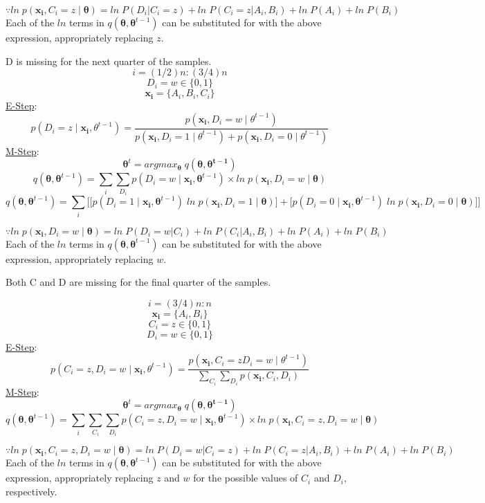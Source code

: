 \documentclass[english]{article}
\begin{document}
\begin{enumerate}
    $$ \because ln \; p(\mathbf{x_i},C_i = z \;|\; \bm{\theta}) = ln \; P(D_i | C_i = z) + ln \; P(C_i = z| A_i, B_i)  + ln \; P(A_i) + ln \; P(B_i)$$
    Each of the $ln$ terms in $q(\bm{\theta},\bm{\theta}^{t-1})$ can be substituted for with the above expression, appropriately replacing $z$.
    
    D is missing for the next quarter of the samples. 
    $$i = (1/2)n:(3/4)n$$
    $$D_i = w \in \{0,1\}$$
    $$\mathbf{x_i} = \{A_i, B_i, C_i\}$$ 
    \underline{E-Step}:
    $$p(D_i = z\;|\; \mathbf{x_i}, \theta^{t-1}) = \frac{p(\mathbf{x_i}, D_i = w \;|\; \theta^{t-1})}{p(\mathbf{x_i}, D_i = 1 \;|\; \theta^{t-1}) + p(\mathbf{x_i}, D_i = 0 \;|\; \theta^{t-1})}$$
    \underline{M-Step}:
    $$\bm{\theta}^t = arg max_{\bm{\theta}} \; q(\bm{\theta},\bm{\theta^{t-1}})$$
    $$ q(\bm{\theta},\bm{\theta}^{t-1}) = \sum_{i}\sum_{D_i}p(D_i = w\;|\; \mathbf{x_i}, \bm{\theta}^{t-1}) \times ln \; p(\mathbf{x_i},D_i = w\;|\; \bm{\theta})$$
    $$q(\bm{\theta},\bm{\theta}^{t-1}) = \sum_{i} \bigg[ \big[p(D_i = 1 \;|\; \mathbf{x_i}, \bm{\theta}^{t-1}) \; ln \; p(\mathbf{x_i},D_i = 1 \;|\; \bm{\theta})\big] + \big[ p(D_i = 0 \;|\; \mathbf{x_i}, \bm{\theta}^{t-1}) \; ln \; p(\mathbf{x_i},D_i = 0 \;|\; \bm{\theta}) \big] \bigg]$$
    
    $$ \because ln \; p(\mathbf{x_i},D_i = w \;|\; \bm{\theta}) = ln \; P(D_i = w | C_i) + ln \; P(C_i | A_i, B_i)  + ln \; P(A_i) + ln \; P(B_i)$$
    Each of the $ln$ terms in $q(\bm{\theta},\bm{\theta}^{t-1})$ can be substituted for with the above expression, appropriately replacing $w$.
    
    Both C and D are missing for the final quarter of the samples.
    
    $$i = (3/4)n:n$$
    $$\mathbf{x_i} = \{A_i, B_i\}$$ 
    $$C_i = z \in \{0,1\}$$
    $$D_i = w \in \{0,1\}$$
    \underline{E-Step}:
    $$p(C_i = z, D_i = w\;|\; \mathbf{x_i}, \theta^{t-1}) = \frac{p(\mathbf{x_i}, C_i = z D_i = w \;|\; \theta^{t-1})}{\sum_{C_i} \sum_{D_i} p(\mathbf{x_i}, C_i, D_i)}$$
    \underline{M-Step}:
    $$\bm{\theta}^t = arg max_{\bm{\theta}} \; q(\bm{\theta},\bm{\theta^{t-1}})$$
    $$ q(\bm{\theta},\bm{\theta}^{t-1}) = \sum_{i}\sum_{C_i}\sum_{D_i}p(C_i = z, D_i = w \;|\; \mathbf{x_i}, \bm{\theta}^{t-1}) \times ln \; p(\mathbf{x_i},C_i = z,D_i = w \;|\; \bm{\theta})$$
      
     $$ \because ln \; p(\mathbf{x_i},C_i = z, D_i = w \;|\; \bm{\theta}) = ln \; P(D_i = w | C_i = z) + ln \; P(C_i = z | A_i, B_i)  + ln \; P(A_i) + ln \; P(B_i)$$
    Each of the $ln$ terms in $q(\bm{\theta},\bm{\theta}^{t-1})$ can be substituted for with the above expression, appropriately replacing $z$ and $w$ for the possible values of $C_i$ and $D_i$, respectively.
      
\end{enumerate}
\end{document}
